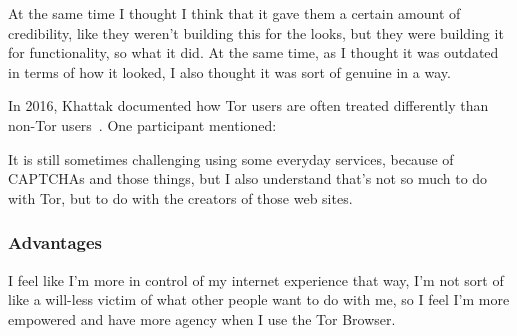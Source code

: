 \begin{displayquote}
At the same time I thought I think that it gave them a certain amount of
credibility, like they weren't building this for the looks, but they were
building it for functionality, so what it did.  At the same time, as I thought
it was outdated in terms of how it looked, I also thought it was sort of genuine
in a way.
\end{displayquote}

In 2016, Khattak \ea documented how Tor users are often treated differently than
non-Tor users~\cite{Khattak2016a}.  One participant mentioned:

\begin{displayquote}
It is still sometimes challenging using some everyday services, because of
CAPTCHAs and those things, but I also understand that's not so much to do with
Tor, but to do with the creators of those web sites.
\end{displayquote}

\subsubsection{Advantages}

\begin{displayquote}
I feel like I'm more in control of my internet experience that way, I'm not sort
of like a will-less victim of what other people want to do with me, so I feel
I'm more empowered and have more agency when I use the Tor Browser.
\end{displayquote}
